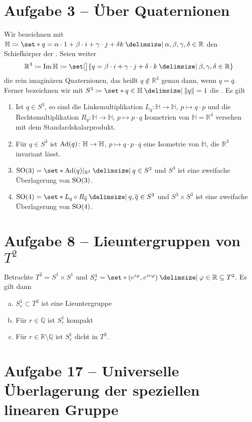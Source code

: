 \section{Aufgabe 3 -- Über Quaternionen} %
\label{sec:aufg3}
Wir bezeichnen mit $\mathbb{H} \coloneqq \set*{q = \alpha \cdot 1 + \beta \cdot i + \gamma \cdot j + \delta k \given \alpha, \beta, \gamma, \delta \in \mathbb{R}}$ den Schiefkörper der .
Seien weiter
\[
	\mathbb{R}^3 \coloneqq \Im \mathbb{H} \coloneqq \set[\big]{q = \beta \cdot i + \gamma \cdot j + \delta \cdot k \given \beta,\gamma,\delta \in \mathbb{R}}
\]
die rein imaginären Quaternionen, das heißt $q \notin \mathbb{R}^3$ genau dann, wenn $q = \overline{q}$.
Ferner bezeichnen wir mit $S^3 \coloneqq \set*{q \in \mathbb{H} \given \norm*{q}=1}$ die .
Es gilt
\begin{enumerate}[(1)]
	\item Ist $q \in S^3$, so sind die Linksmultiplikation $L_q \colon \mathbb{H} \to \mathbb{H}$, $p \mapsto q \cdot p$ und die Rechtsmultiplikation $R_q \colon \mathbb{H} \to \mathbb{H}$, $p \mapsto p \cdot q$ Isometrien von $\mathbb{H}=\mathbb{R}^4$ versehen mit dem Standardskalarprodukt.
	\item Für $q \in S^3$ ist $\operatorname{Ad}(q) \colon \mathbb{H} \to \mathbb{H}$, $p \mapsto q \cdot p \cdot \overline{q}$ eine Isometrie von $\mathbb{H}$, die $\mathbb{R}^3$ invariant lässt.
	\item $\SO(3) = \set*{\Ad(q)|_{\mathbb{R}^3} \given q \in S^3}$ und $S^3$ ist eine zweifache Überlagerung von $\operatorname{SO}(3)$.
	\item $\SO(4) = \set*{L_q \circ R_{\overline{q}} \given q,\overline{q} \in S^3}$ und $S^3 \times S^3$ ist eine zweifache Überlagerung von $\operatorname{SO}(4)$.
\end{enumerate}
\begin{beweis}
\end{beweis}

\section{Aufgabe 8 -- Lieuntergruppen von $T^2$} %
\label{sec:aufg8}
Betrachte $T^2= S^1 \times S^1$ und $S^1_r = \set*{(e^{i \varphi}, e^{i r \varphi}) \given \varphi \in \mathbb{R}} \subseteq T^2$.
Es gilt dann
\begin{enumerate}[a)]
	\item $S^1_r \subset T^2$ ist eine Lieuntergruppe
	\item Für $r \in \mathbb{Q}$ ist $S^1_r$ kompakt
	\item Für $r \in \mathbb{R} \setminus \mathbb{Q}$ ist $S^1_r$ dicht in $T^2$.
\end{enumerate}
\begin{beweis}
\end{beweis}

\section{Aufgabe 17 -- Universelle Überlagerung der speziellen linearen Gruppe} %
\label{sec:aufg17}












